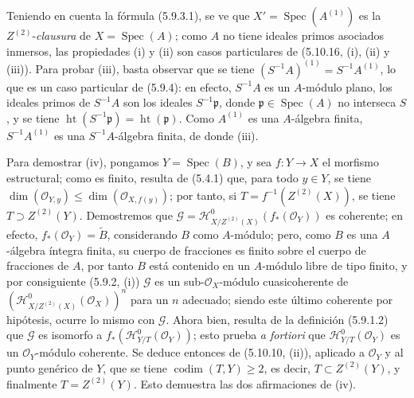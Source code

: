 Teniendo en cuenta la fórmula (5.9.3.1), se ve que
$X'=\operatorname{Spec}(A^{(1)})$ es la $Z^{(2)}$-\emph{clausura} de
$X=\operatorname{Spec}(A)$; como $A$ no tiene ideales primos asociados
inmersos, las propiedades (i) y (ii) son casos particulares de (5.10.16,
(i), (ii) y (iii)). Para probar (iii), basta observar que se tiene
$(S^{-1}A)^{(1)}=S^{-1}A^{(1)}$, lo que es un caso particular de (5.9.4): en
efecto, $S^{-1}A$ es un $A$-módulo plano, los ideales primos de $S^{-1}A$ son
los ideales $S^{-1}\mathfrak p$, donde
$\mathfrak p\in\operatorname{Spec}(A)$ no interseca $S$, y se tiene
$\operatorname{ht}(S^{-1}\mathfrak p)=\operatorname{ht}(\mathfrak p)$. Como
$A^{(1)}$ es una $A$-álgebra finita, $S^{-1}A^{(1)}$ es una
$S^{-1}A$-álgebra finita, de donde (iii).

Para demostrar (iv), pongamos $Y=\operatorname{Spec}(B)$, y sea
$f:Y\to X$ el morfismo estructural; como es finito, resulta de (5.4.1) que,
para todo $y\in Y$, se tiene
$\dim(\mathcal O_{Y,y})\leq\dim(\mathcal O_{X,f(y)})$; por tanto, si
$T=f^{-1}(Z^{(2)}(X))$, se tiene $T\supset Z^{(2)}(Y)$. Demostremos que
$\mathcal G=\mathcal H^0_{X/Z^{(2)}(X)}(f_*(\mathcal O_Y))$
es coherente; en efecto, $f_*(\mathcal O_Y)=\widetilde B$, considerando $B$
como $A$-módulo; pero, como $B$ es una $A$-álgebra íntegra finita, su cuerpo
de fracciones es finito sobre el cuerpo de fracciones de $A$, por tanto $B$
está contenido en un $A$-módulo libre de tipo finito, y por consiguiente
(5.9.2, (i)) $\mathcal G$ es un sub-$\mathcal O_X$-módulo cuasicoherente de
$(\mathcal H^0_{X/Z^{(2)}(X)}(\mathcal O_X))^n$ para un $n$ adecuado; siendo
este último coherente por hipótesis, ocurre lo mismo con $\mathcal G$. Ahora
bien, resulta de la definición (5.9.1.2) que $\mathcal G$ es isomorfo a
$f_*(\mathcal H^0_{Y/T}(\mathcal O_Y))$; esto prueba \emph{a fortiori} que
$\mathcal H^0_{Y/T}(\mathcal O_Y)$ es un $\mathcal O_Y$-módulo coherente. Se
deduce entonces de (5.10.10, (ii)), aplicado a $\mathcal O_Y$ y al punto
genérico de $Y$, que se tiene $\operatorname{codim}(T,Y)\geq2$, es decir,
$T\subset Z^{(2)}(Y)$, y finalmente $T=Z^{(2)}(Y)$. Esto demuestra las dos
afirmaciones de (iv).

